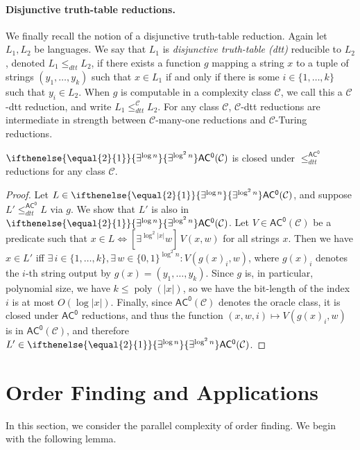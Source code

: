 \documentclass{theoretics}
\newcommand{\betacc}[1]{\ifthenelse{\equal{#1}{1}}{\exists^{\log n}}{\exists^{\log^{#1}n}}} %
\DeclareMathOperator{\poly}{poly}
\newcommand*{\ComplexityClass}[1]{\ensuremath{\mathsf{#1}}\xspace}
\newcommand{\ACz}{\ComplexityClass{AC^0}}
\begin{document}
\paragraph{Disjunctive truth-table reductions.} We finally recall the notion of a disjunctive truth-table reduction. Again let $L_{1}, L_{2}$ be languages. We say that $L_{1}$ is \textit{disjunctive truth-table (dtt)} reducible to $L_{2}$, denoted $L_{1} \leq_{dtt} L_{2}$, if there exists a function $g$ mapping a string $x$ to a tuple of strings $(y_{1}, \ldots, y_{k})$ such that $x \in L_1$ if and only if there is some $i \in \{1,\dots, k\}$ such that $y_i \in L_2$. When $g$ is computable in a complexity class $\mathcal{C}$, we call this a $\mathcal{C}$-dtt reduction, and write $L_1 \leq_{dtt}^\mathcal{C} L_2$. For any class $\mathcal{C}$, $\mathcal{C}$-dtt reductions are intermediate in strength between $\mathcal{C}$-many-one reductions and $\mathcal{C}$-Turing reductions. 

\begin{fact} \label{fact:dtt}
$\betacc{2} \ACz(\mathcal{C})$ is closed under $\leq_{dtt}^\ACz$ reductions for any class $\mathcal{C}$.
\end{fact}

\begin{proof}
Let $L \in \betacc{2}\ACz(\mathcal{C})$, and suppose $L' \leq_{dtt}^\ACz L$ via $g$. We show that $L'$ is also in $\betacc{2}\ACz(\mathcal{C})$. Let $V \in \ACz(\mathcal{C})$ be a predicate such that $x \in L \iff [\exists^{\log^2 |x|} w] \,V(x,w)$ for all strings $x$.
Then we have $x \in L'$ iff $\exists\, i \in \{1, \dots, k\}, \exists\, w \in \{0,1\}^{\log^2 n}: V(g(x)_i, w)$, where $g(x)_i$ denotes the $i$-th string output by $g(x)=(y_1,\dotsc,y_k)$. Since $g$ is, in particular, polynomial size, we have $k \leq \poly(|x|)$, so we have the bit-length of the index $i$ is at most $O(\log|x|)$. Finally, since $\ACz(\mathcal{C})$ denotes the oracle class, it is closed under $\ACz$ reductions, and thus the function $(x,w,i) \mapsto V(g(x)_i, w)$ is in $\ACz(\mathcal{C})$, and therefore $L' \in \betacc{2}\ACz(\mathcal{C})$.
\end{proof}

\section{Order Finding and Applications}

In this section, we consider the parallel complexity of order finding. We begin with the following lemma.
\end{document}

